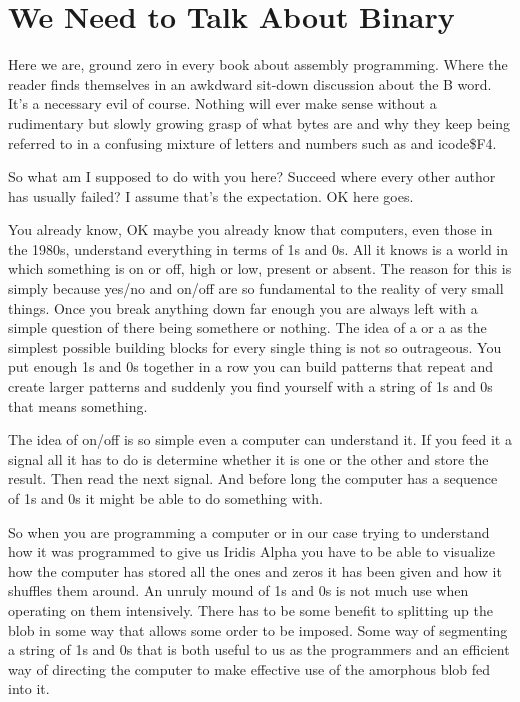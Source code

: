 \chapter{We Need to Talk About Binary} 
\lstset{style=6502Style}

Here we are, ground zero in every book about assembly programming. Where the reader
finds themselves in an awkdward sit-down discussion about the B word. It's a necessary evil
of course. Nothing will ever make sense without a rudimentary but slowly growing
grasp of what bytes are and why they keep being referred to in a confusing mixture
of letters and numbers such as  and icode{\$F4}.

So what am I supposed to do with you here? Succeed where every other author has
usually failed? I assume that's the expectation. OK here goes.

You already know, OK maybe you already know that computers, even those in the 
1980s, understand everything in terms of 1s and 0s. All it knows is a world
in which something is on or off, high or low, present or absent. The reason
for this is simply because yes/no and on/off are so fundamental to the reality
of very small things. Once you break anything down far enough you are always
left with a simple question of there being somethere or nothing. The idea of a
 or a  as the simplest possible building blocks for every
single thing is not so outrageous. You put enough 1s and 0s together in a row
you can build patterns that repeat and create larger patterns and suddenly
you find yourself with a string of 1s and 0s that means something.

The idea of on/off is so simple even a computer can understand it. If you feed
it a signal all it has to do is determine whether it is one or the other and
store the result. Then read the next signal. And before long the computer
has a sequence of 1s and 0s it might be able to do something with.

So when you are programming a computer or in our case trying to understand
how it was programmed to give us Iridis Alpha you have to be able to visualize
how the computer has stored all the ones and zeros it has been given and how
it shuffles them around. An unruly mound of 1s and 0s is not much use when
operating on them intensively. There has to be some benefit to splitting
up the blob in some way that allows some order to be imposed. Some way
of segmenting a string of 1s and 0s that is both useful to us as the
programmers and an efficient way of directing the computer to make effective
use of the amorphous blob fed into it.

